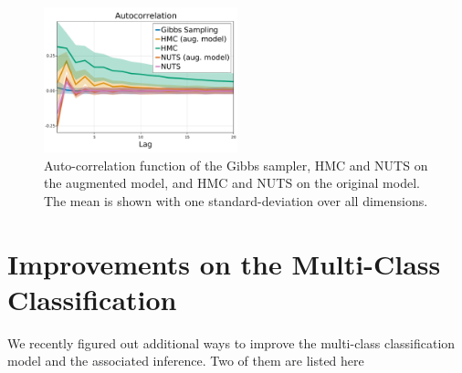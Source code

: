 \begin{figure}[H]
    \centering
    \includegraphics[width=0.5\textwidth]{./chapters/8_discussions/figures/autocorrelation.pdf}
    \caption{Auto-correlation function of the Gibbs sampler, \ac{HMC} and \ac{NUTS} on the augmented model, and \ac{HMC} and \ac{NUTS} on the original model.
    The mean is shown with one standard-deviation over all dimensions.}
    \label{fig:hmc_vs_gibbs}
\end{figure}


\section{Improvements on the Multi-Class Classification}
\label{sec:improvemulticlass}
We recently figured out additional ways to improve the multi-class classification model and the associated inference.
Two of them are listed here

